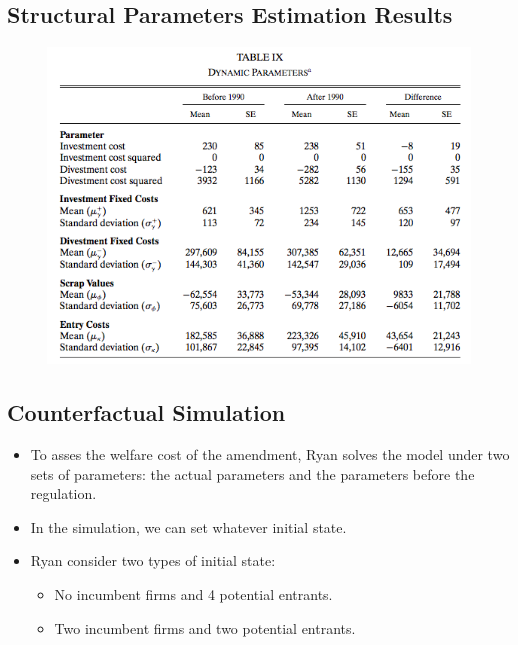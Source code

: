 \documentclass[
]{book}
\providecommand{\tightlist}{%
  \setlength{\itemsep}{0pt}\setlength{\parskip}{0pt}}
\begin{document}
\hypertarget{structural-parameters-estimation-results}{%
\subsection{Structural Parameters Estimation Results}\label{structural-parameters-estimation-results}}

\begin{figure}

{\centering \includegraphics[width=0.8\linewidth]{figuretable/dynamic} 

}

\end{figure}

\hypertarget{counterfactual-simulation}{%
\subsection{Counterfactual Simulation}\label{counterfactual-simulation}}

\begin{itemize}
\tightlist
\item
  To asses the welfare cost of the amendment, Ryan solves the model under two sets of parameters: the actual parameters and the parameters before the regulation.
\item
  In the simulation, we can set whatever initial state.
\item
  Ryan consider two types of initial state:

  \begin{itemize}
  \tightlist
  \item
    No incumbent firms and 4 potential entrants.
  \item
    Two incumbent firms and two potential entrants.
  \end{itemize}
\end{itemize}
\end{document}
